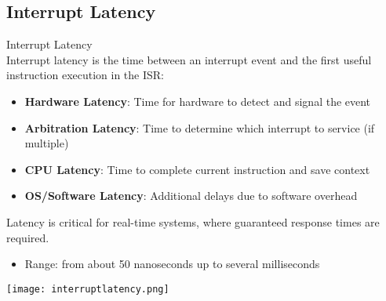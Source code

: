 \raggedcolumns
\columnbreak





\subsection{Interrupt Latency}

\begin{definition}{Interrupt Latency}\\
Interrupt latency is the time between an interrupt event and the first useful instruction execution in the ISR:
\begin{itemize}
    \item \textbf{Hardware Latency}: Time for hardware to detect and signal the event
    \item \textbf{Arbitration Latency}: Time to determine which interrupt to service (if multiple)
    \item \textbf{CPU Latency}: Time to complete current instruction and save context
    \item \textbf{OS/Software Latency}: Additional delays due to software overhead
\end{itemize}
Latency is critical for real-time systems, where guaranteed response times are required.
\begin{itemize}
    \item Range: from about 50 nanoseconds up to several milliseconds
\end{itemize}
\texttt{[image: interruptlatency.png]}
\end{definition}

